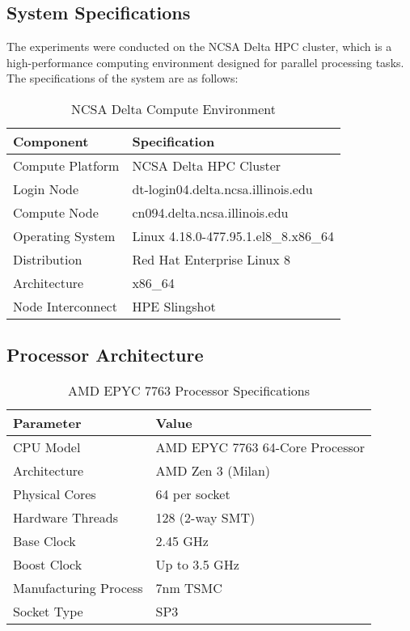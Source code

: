 \documentclass[11pt]{article}
\begin{document}
\subsection{System Specifications}
The experiments were conducted on the NCSA Delta HPC cluster, which is a high-performance computing environment designed for parallel processing tasks. The specifications of the system are as follows:
\begin{table}[H]
\centering
\caption{NCSA Delta Compute Environment}
\label{tab:system_specs}
\begin{tabular}{@{}ll@{}}
\hline
\textbf{Component} & \textbf{Specification} \\
\hline
Compute Platform & NCSA Delta HPC Cluster \\
Login Node & dt-login04.delta.ncsa.illinois.edu \\
Compute Node & cn094.delta.ncsa.illinois.edu \\
Operating System & Linux 4.18.0-477.95.1.el8\_8.x86\_64 \\
Distribution & Red Hat Enterprise Linux 8 \\
Architecture & x86\_64 \\
Node Interconnect & HPE Slingshot \\
\hline
\end{tabular}
\end{table}


\subsection{Processor Architecture}

\begin{table}[H]
\centering
\caption{AMD EPYC 7763 Processor Specifications}
\label{tab:processor_specs}
\begin{tabular}{@{}ll@{}}
\hline
\textbf{Parameter} & \textbf{Value} \\
\hline
CPU Model & AMD EPYC 7763 64-Core Processor \\
Architecture & AMD Zen 3 (Milan) \\
Physical Cores & 64 per socket \\
Hardware Threads & 128 (2-way SMT) \\
Base Clock & 2.45 GHz \\
Boost Clock & Up to 3.5 GHz \\
Manufacturing Process & 7nm TSMC \\
Socket Type & SP3 \\
\hline
\end{tabular}
\end{table}
\end{document}
